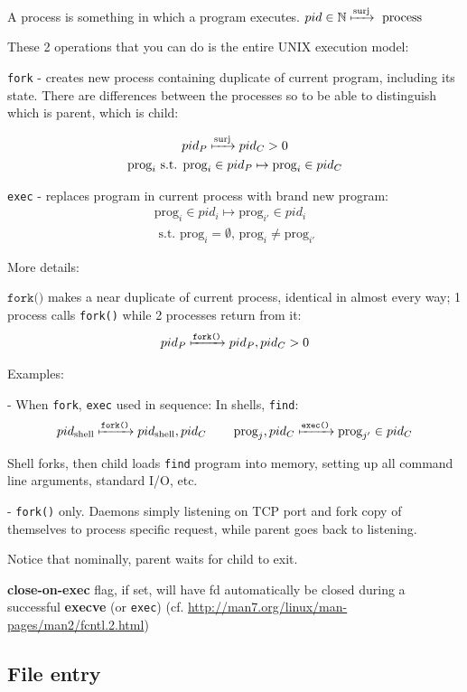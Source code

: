 \documentclass[10pt]{amsart}
\begin{document}
A process is something in which a program executes. $pid \in \mathbb{N} \xmapsto{\text{surj}} \text{ process }$

These 2 operations that you can do is the entire UNIX execution model:

\texttt{fork} - creates new process containing duplicate of current program, including its state. There are differences between the processes so to be able to distinguish which is parent, which is child:

\[
\begin{gathered}
pid_P \xmapsto{\text{surj}} pid_C > 0 \\
\text{prog}_i \text{ s.t. } \text{prog}_i \in pid_P \mapsto \text{prog}_i \in pid_C 
\end{gathered}
\]

\texttt{exec} - replaces program in current process with brand new program:
\[
\begin{gathered}
\text{prog}_i \in pid_i \mapsto \text{prog}_{i'} \in pid_i \\
\text{ s.t. } \text{prog}_i = \emptyset, \, \text{prog}_i \neq \text{prog}_{i'}
\end{gathered}
\]

More details:

$\texttt{fork()}$ makes a near duplicate of current process, identical in almost every way; 1 process calls \texttt{fork()} while 2 processes return from it:
\[
pid_P \xmapsto{\texttt{fork()}} pid_P, pid_C >0
\]

Examples:

- When \texttt{fork}, \texttt{exec} used in sequence: 
In shells, \texttt{find}: 
\[
pid_{\text{shell}} \xmapsto{\texttt{fork()}} pid_{\text{shell}}, pid_C \qquad \, \text{prog}_j, pid_C \xmapsto{\texttt{exec()}} \text{prog}_{j'} \in pid_C
\] 

Shell forks, then child loads \texttt{find} program into memory, setting up all command line arguments, standard I/O, etc.

- \texttt{fork()} only.
Daemons simply listening on TCP port and fork copy of themselves to process specific request, while parent goes back to listening. 

Notice that nominally, parent waits for child to exit. 

\textbf{close-on-exec} flag, if set, will have fd automatically be closed during a successful \textbf{execve} (or \texttt{exec}) (cf. \url{http://man7.org/linux/man-pages/man2/fcntl.2.html})

\subsection{File entry}
\end{document}
